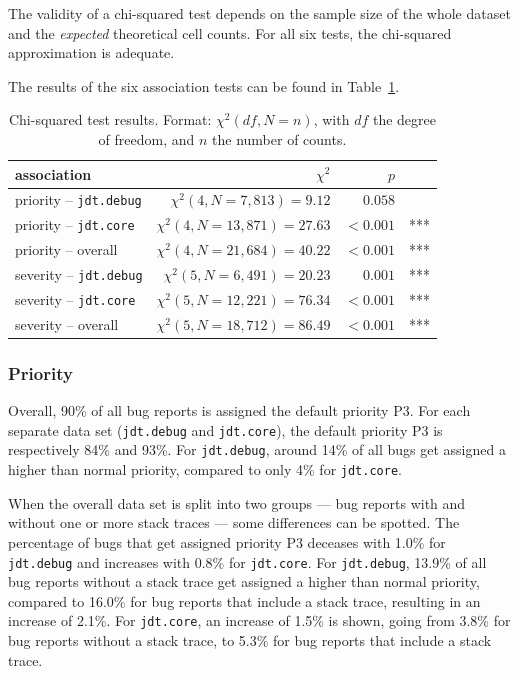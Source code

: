The validity of a chi-squared test depends on the sample size of the whole dataset and the \emph{expected} theoretical cell counts. For all six tests, the chi-squared approximation is adequate.

The results of the six association tests can be found in Table~\ref{tab:chi2}.

\begin{table}[!ht]\footnotesize
	\centering
	\begin{tabular}{lrrl}
		\toprule		
		association & $\chi^2$ & $p$ & \\
		\midrule
		priority -- \texttt{jdt.debug} & $\chi^2(4, N=7,813) = 9.12$ & $0.058$ & \\
		priority -- \texttt{jdt.core} & $\chi^2(4, N=13,871) = 27.63$ & $< 0.001$ & ***\\
		priority -- overall & $\chi^2(4, N=21,684) = 40.22$ & $< 0.001$ & ***\\
		\midrule
		severity -- \texttt{jdt.debug} & $\chi^2(5, N=6,491) = 20.23$ & $0.001$ & *** \\
		severity -- \texttt{jdt.core} & $\chi^2(5, N=12,221) = 76.34$ & $< 0.001$ & *** \\
		severity -- overall & $\chi^2(5, N=18,712) = 86.49$ & $< 0.001$ & ***\\
		\bottomrule
	\end{tabular} 
	\caption{Chi-squared test results. Format: $\chi^2(df, N=n)$, with $df$ the degree of freedom, and $n$ the number of counts.}
	\label{tab:chi2}
\end{table}

\subsubsection{Priority} %
Overall, 90\% of all bug reports is assigned the default priority P3. For each separate data set (\texttt{jdt.debug} and \texttt{jdt.core}), the default priority P3 is respectively 84\% and 93\%. For \texttt{jdt.debug}, around 14\% of all bugs get assigned a higher than normal priority, compared to only 4\% for \texttt{jdt.core}. 

When the overall data set is split into two groups --- bug reports with and without one or more stack traces --- some differences can be spotted. The percentage of bugs that get assigned priority P3 deceases with 1.0\% for \texttt{jdt.debug} and increases with 0.8\% for \texttt{jdt.core}. For \texttt{jdt.debug}, 13.9\% of all bug reports without a stack trace get assigned a higher than normal priority, compared to 16.0\% for bug reports that include a stack trace, resulting in an increase of 2.1\%. For \texttt{jdt.core}, an increase of 1.5\% is shown, going from 3.8\% for bug reports without a stack trace, to 5.3\% for bug reports that include a stack trace. 

